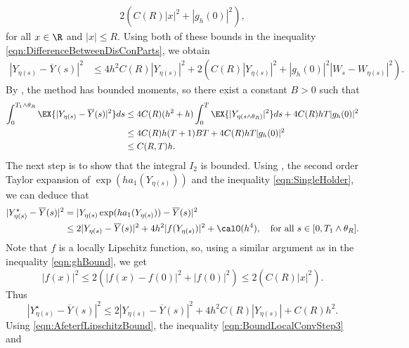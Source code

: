 \begin{pf}
\begin{align}
		2\left(
		C(R)|x|^2+|g_h(0)|^2
		\right),\label{eqn:ghBound}
		\end{align}
	for all $x \in \R$ and $|x|\leq R$.
	Using both of these bounds in the inequality  \eqref{eqn:DifferenceBetweenDisConParts}, we obtain
	\begin{align*}
		|Y_{\eta(s)}-\overline{Y}(s)|^2
		&\leq
		4h^2 C(R)|Y_{\eta(s)}|^2
		+
		2\left(
		C(R)|Y_{\eta(s)}|^2
		+|g_h(0)|^2
		|W_s-W_{\eta(s)}|^2
		\right).
	\end{align*}
	By , the \SM method has bounded moments, so there exist a constant $B>0$ such
	that
	\begin{align}
		\int_0^{T_1\wedge \theta_R}
		\EX{
			|Y_{\eta(s)}-\overline{Y}(s)|^2
		}ds
		&\leq
		4C(R)(h^2+h)
		\int_{0}^T
		\EX{|Y_{\eta(s\wedge \theta_R)}|^2}ds
		+4C(R)hT|g_h(0)|^2
		\notag\\
		&\leq
		4C(R)h(T+1)
		BT
		+4C(R)hT|g_h(0)|^2 \notag\\
		&\leq
		C(R,T)h. \label{eqn:BoundLocalConvStep3}
	\end{align}
	The next step is to show that the integral $I_2$ is bounded. 
	Using ,  the second order Taylor expansion of 
	$\exp(ha_1(Y_{\eta(s)}))$ and the inequality \eqref{eqn:SingleHolder}, we can deduce that
	\begin{align*}
		|Y_{\eta(s)}^{\star} - \overline{Y}(s)|^2
			&=|Y_{\eta(s)}\exp(ha_1(Y_{\eta(s)})) - \overline{Y}(s)|^2 \notag \\
			&\leq
				2 |Y_{\eta(s)} - \overline{Y}(s)|^2  + 4h^2|f(Y_{\eta(s)})|^2 +\calO(h^4),
		\quad \text{for all }s\in [0,T_1\wedge \theta_R].
	\end{align*}
	Note that $f$ is a locally Lipschitz function, so, using a similar argument as in the inequality 
	\eqref{eqn:ghBound}, we get
	\begin{equation*}
		|f(x)|^2
			\leq
				2\left(
					\left|
						f(x)-f(0)
					\right|^2
				+\left|
					f(0)
				\right|^2
			\right)
			\leq 
			2\left(
			C(R)|x|^2 %
			\right).
	\end{equation*}
	Thus
	\begin{equation}\label{eqn:AfeterfLipschitzBound}
		|Y_{\eta(s)}^{\star} - \overline{Y}(s)|^2
		\leq
		2 |Y_{\eta(s)} - \overline{Y}(s)|^2  + 4h^2C(R)|Y_{\eta(s)}| +C(R)h^2.
	\end{equation}
	Using \eqref{eqn:AfeterfLipschitzBound}, the inequality \eqref{eqn:BoundLocalConvStep3} and 

\end{pf}
